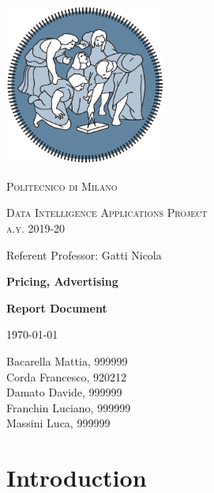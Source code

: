 \documentclass{article}
\begin{document}
\begin{titlepage}
	\centering
	\includegraphics[width=150pt]{images/polimi_logo}\par\vspace{1cm}
	{\scshape\LARGE
		Politecnico di Milano\par}
	\vspace{1cm}
	{\scshape\Large
		Data Intelligence Applications Project\\
		a.y. 2019-20\par}
		\vfill
		\Large Referent Professor: Gatti Nicola\par
	\vspace{1.5cm}
	{\huge\bfseries
		Pricing, Advertising\\\par}
	{\Large\bfseries
		Report Document\par}
	\today\par

	\vspace{2cm}
	{\Large
		Bacarella Mattia, 999999\\
		Corda Francesco, 920212\\
		Damato Davide, 999999\\
		Franchin Luciano, 999999\\
		Massini Luca, 999999\\
	    \par}
	\vfill
\end{titlepage}


\tableofcontents
\newpage


\section{Introduction}
\newpage
\end{document}
